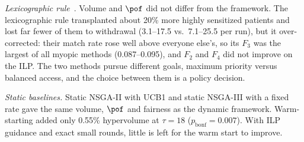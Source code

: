 \emph{Lexicographic rule}~\cite{dickerson2014price}. Volume and
$\pof$ did not differ from the framework. The lexicographic rule
transplanted about 20\% more highly sensitized patients and lost far
fewer of them to withdrawal (3.1--17.5 vs.\ 7.1--25.5 per run), but it
over-corrected: their match rate rose well above everyone else's, so
its $F_3$ was the largest of all myopic methods (0.087--0.095), and
$F_2$ and $F_4$ did not improve on the ILP. The two methods pursue
different goals, maximum priority versus balanced access, and the
choice between them is a policy decision.

\emph{Static baselines.} Static NSGA-II with UCB1 and static NSGA-III
with a fixed rate gave the same volume, $\pof$ and fairness as the
dynamic framework. Warm-starting added only 0.55\% hypervolume at
$\tau = 18$ ($p_{\mathrm{bonf}} = 0.007$). With ILP guidance and exact
small rounds, little is left for the warm start to improve.

